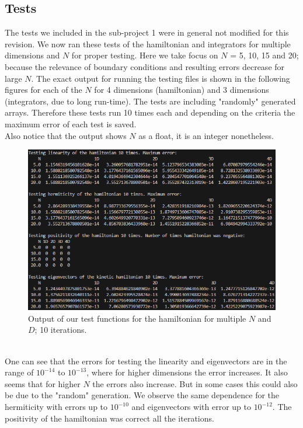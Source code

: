 \documentclass[11pt, letterpaper, onecolumn]{article}
\begin{document}
	\subsection{Tests}
	The tests we included in the sub-project 1 were in general not modified for this revision. We now ran these tests of the hamiltonian and integrators for multiple dimensions and $N$ for proper testing. Here we take focus on $N$ = 5, 10, 15 and 20; because the relevance of boundary conditions and resulting errors decrease for large $N$. The exact output for running the testing files is shown in the following figures for each of the $N$ for 4 dimensions (hamiltonian) and 3 dimensions (integrators, due to long run-time). The tests are including "randomly" generated arrays. Therefore these tests run 10 times each and depending on the criteria the maximum error of each test is saved.\\
	Also notice that the output shows $N$ as a float, it is an integer nonetheless.
	\begin{figure} [h] 
	\begin{center}
	\includegraphics[width=15cm]{"test_hamiltonian2.png"}
	\caption{Output of our test functions for the hamiltonian for multiple $N$ and $D$; 10 iterations.}
	\end{center}
	\end{figure}
	\\
	One can see that the errors for testing the linearity and eigenvectors are in the range of $10^{-14}$ to $10^{-13}$, where for higher dimensions the error increases. It also seems that for higher $N$ the errors also increase. But in some cases this could also be due to the "random" generation. We observe the same dependence for the hermiticity with errors up to $10^{-10}$ and eigenvectors with error up to $10^{-12}$. The positivity of the hamiltonian was correct all the iterations.\\
\end{document}
